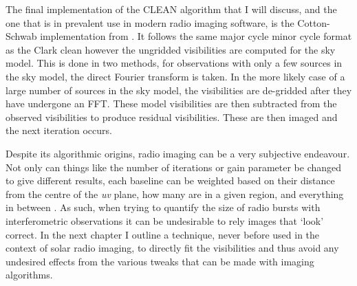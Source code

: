 The final implementation of the CLEAN algorithm that I will discuss, and the one that is in prevalent use in modern radio imaging software, is the Cotton-Schwab implementation from \cite{Schwab1984}. It follows the same major cycle minor cycle format as the Clark clean however the ungridded visibilities are computed for the sky model. This is done in two methods, for observations with only a few sources in the sky model, the direct Fourier transform is taken. In the more likely case of a large number of sources in the sky model, the visibilities are de-gridded after they have undergone an FFT. These model visibilities are then subtracted from the observed visibilities to produce residual visibilities. These are then imaged and the next iteration occurs.

Despite its algorithmic origins, radio imaging can be a very subjective endeavour. Not only can things like the number of iterations or gain parameter be changed to give different results, each baseline can be weighted based on their distance from the centre of the \textit{uv} plane, how many are in a given region, and everything in between \citep{Briggs1995}. As such, when trying to quantify the size of radio bursts with interferometric observations it can be undesirable to rely images that `look' correct. In the next chapter I outline a technique, never before used in the context of solar radio imaging, to directly fit the visibilities and thus avoid any undesired effects from the various tweaks that can be made with imaging algorithms.